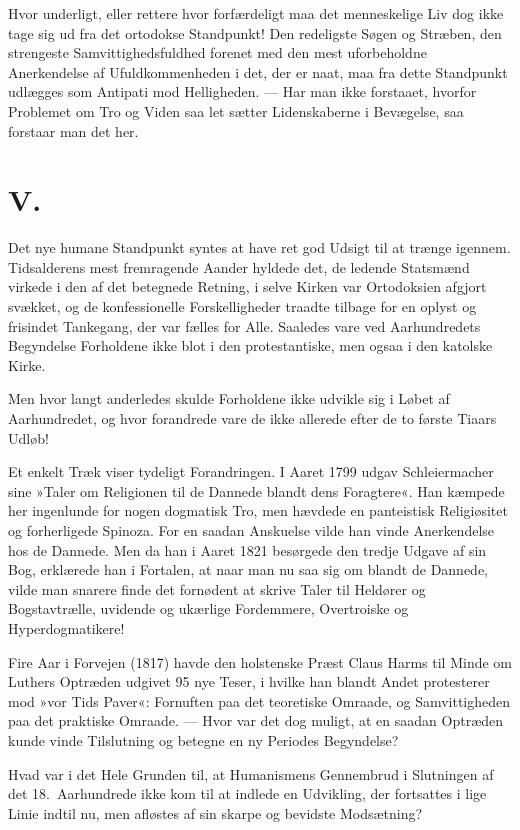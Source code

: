 \documentclass[12pt,a4paper]{article}
\newcommand{\apage}[1]{\marginnote{\footnotesize\textit{[#1]}}}
\begin{document}
Hvor underligt, eller rettere hvor forfærdeligt maa det menneskelige Liv dog
ikke tage sig ud fra det ortodokse Standpunkt! Den redeligste Søgen og
Stræben, den strengeste Samvittighedsfuldhed forenet med den mest
uforbeholdne Anerkendelse af Ufuldkommenheden i det, der er naat, maa fra
dette Standpunkt udlægges som Antipati mod Helligheden. --- Har man ikke
forstaaet, hvorfor Problemet om Tro og Viden saa let sætter \apage{202} Lidenskaberne i
Bevægelse, saa forstaar man det her.

\section*{V.}

Det nye humane Standpunkt syntes at have ret god Udsigt til at trænge
igennem. Tidsalderens mest fremragende Aander hyldede det, de ledende
Statsmænd virkede i den af det betegnede Retning, i selve Kirken var
Ortodoksien afgjort svækket, og de konfessionelle Forskelligheder traadte
tilbage for en oplyst og frisindet Tankegang, der var fælles for Alle.
Saaledes vare ved Aarhundredets Begyndelse Forholdene ikke blot i den
protestantiske, men ogsaa i den katolske Kirke.

Men hvor langt anderledes skulde Forholdene ikke udvikle sig i Løbet af
Aarhundredet, og hvor forandrede vare de ikke allerede efter de to første
Tiaars Udløb!

Et enkelt Træk viser tydeligt Forandringen. I Aaret 1799 udgav Schleiermacher
sine »Taler om Religionen til de Dannede blandt dens Foragtere«. Han kæmpede
her ingenlunde for nogen dogmatisk Tro, men hævdede en panteistisk
Religiøsitet og forherligede Spinoza. For en saadan Anskuelse vilde han vinde
Anerkendelse hos de Dannede. Men da han i Aaret 1821 besørgede den tredje
Udgave af sin Bog, erklærede han i Fortalen, at naar man nu saa sig om blandt
de Dannede, vilde man snarere finde det fornødent at skrive Taler til Heldører
og Bogstavtrælle, uvidende og ukærlige Fordemmere, Overtroiske og
Hyperdogmatikere!

Fire Aar i Forvejen (1817) havde den holstenske Præst Claus Harms til Minde
om Luthers Optræden udgivet 95 nye Teser, i hvilke han blandt Andet
protesterer mod »vor Tids Paver«: Fornuften paa det teoretiske Omraade, og
Samvittigheden paa det praktiske Omraade. --- Hvor var det dog muligt, at en
saadan Optræden kunde vinde Tilslutning og betegne en ny Periodes Begyndelse?

Hvad var i det Hele Grunden til, at Humanismens Gennembrud i Slutningen af
det 18.\ Aarhundrede ikke kom til at indlede en Udvikling, der fortsattes i
lige Linie indtil nu, men afløstes af sin skarpe og bevidste Modsætning?
\end{document}

